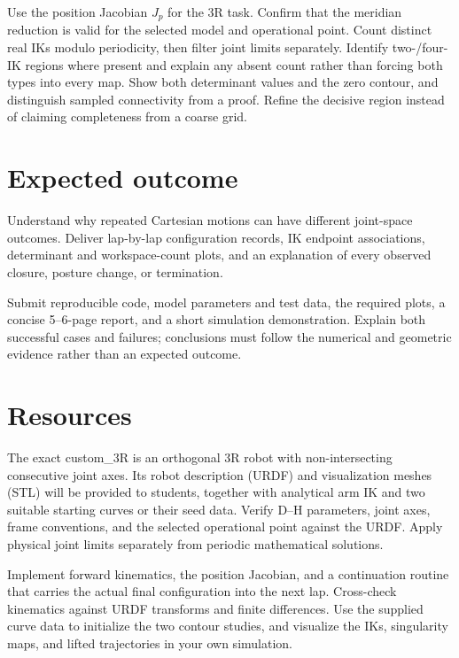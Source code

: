 \documentclass[11pt,a4paper]{article}
\begin{document}
Use the position Jacobian $J_p$ for the 3R task.
Confirm that the meridian reduction is valid for the selected model and
operational point. Count distinct real IKs modulo periodicity, then filter
joint limits separately. Identify two-/four-IK regions where present and
explain any absent count rather than forcing both types into every map. Show both determinant values and the zero contour,
and distinguish sampled connectivity from a proof. Refine the decisive
region instead of claiming completeness from a coarse grid.

\section*{Expected outcome}
Understand why repeated Cartesian motions can have different joint-space
outcomes. Deliver lap-by-lap configuration records, IK endpoint associations,
determinant and workspace-count plots, and an explanation of every observed
closure, posture change, or termination.

Submit reproducible code, model parameters and test data, the required plots,
a concise 5--6-page report, and a short simulation demonstration. Explain
both successful cases and failures; conclusions must follow the numerical
and geometric evidence rather than an expected outcome.

\section*{Resources}
The exact custom\_3R is an orthogonal 3R robot with non-intersecting
consecutive joint axes. Its robot description (URDF) and visualization meshes
(STL) will be provided to students, together with analytical arm IK and two
suitable starting curves or their seed data. Verify D--H parameters, joint
axes, frame conventions, and the selected operational point against the URDF.
Apply physical joint limits separately from periodic mathematical solutions.

Implement forward kinematics, the position Jacobian, and a continuation
routine that carries the actual final configuration into the next lap.
Cross-check kinematics against URDF transforms and finite differences. Use the
supplied curve data to initialize the two contour studies, and visualize the
IKs, singularity maps, and lifted trajectories in your own simulation.
\end{document}
